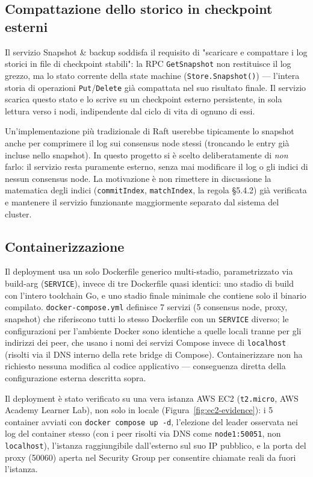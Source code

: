 \documentclass[conference]{IEEEtran}
\begin{document}
\subsection{Compattazione dello storico in checkpoint esterni}

Il servizio Snapshot \& backup soddisfa il requisito di "scaricare e
compattare i log storici in file di checkpoint stabili": la RPC
\texttt{GetSnapshot} non restituisce il log grezzo, ma lo stato corrente
della state machine (\texttt{Store.Snapshot()}) — l'intera storia di
operazioni \texttt{Put}/\texttt{Delete} già compattata nel suo risultato
finale. Il servizio scarica questo stato e lo scrive su un checkpoint
esterno persistente, in sola lettura verso i nodi, indipendente dal ciclo
di vita di ognuno di essi.

Un'implementazione più tradizionale di Raft userebbe tipicamente lo
snapshot anche per comprimere il log sui consensus node stessi (troncando
le entry già incluse nello snapshot). In questo progetto si è scelto
deliberatamente di \emph{non} farlo: il servizio resta puramente esterno,
senza mai modificare il log o gli indici di nessun consensus node. La
motivazione è non rimettere in discussione la matematica degli indici
(\texttt{commitIndex}, \texttt{matchIndex}, la regola \S5.4.2) già
verificata e mantenere il servizio funzionante maggiormente separato dal sistema del cluster.
\subsection{Containerizzazione}
\label{sec:docker}

Il deployment usa un solo Dockerfile generico multi-stadio, parametrizzato
via build-arg (\texttt{SERVICE}), invece di tre Dockerfile quasi identici:
uno stadio di build con l'intero toolchain Go, e uno stadio finale
minimale che contiene solo il binario compilato. \texttt{docker-compose.yml}
definisce 7 servizi (5 consensus node, proxy, snapshot) che riferiscono
tutti lo stesso Dockerfile con un \texttt{SERVICE} diverso; le
configurazioni per l'ambiente Docker sono identiche a quelle locali tranne
per gli indirizzi dei peer, che usano i nomi dei servizi Compose invece di
\texttt{localhost} (risolti via il DNS interno della rete bridge di
Compose). Containerizzare non ha richiesto nessuna modifica al codice
applicativo — conseguenza diretta della configurazione esterna descritta
sopra.

Il deployment è stato verificato su una vera istanza AWS EC2
(\texttt{t2.micro}, AWS Academy Learner Lab), non solo in locale
(Figura~\ref{fig:ec2-evidence}): i 5 container avviati con
\texttt{docker compose up -d}, l'elezione del leader osservata nei log del
container stesso (con i peer risolti via DNS come \texttt{node1:50051}, non
\texttt{localhost}), l'istanza raggiungibile dall'esterno sul suo IP
pubblico, e la porta del proxy (50060) aperta nel Security Group per
consentire chiamate reali da fuori l'istanza.
\end{document}
